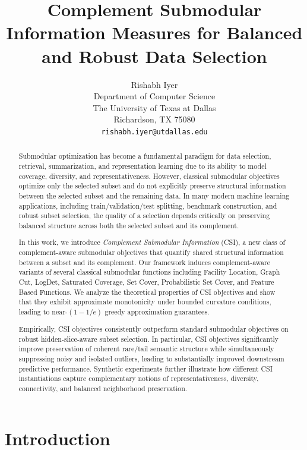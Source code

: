 \documentclass[11pt]{article}
\title{
Complement Submodular Information Measures for Balanced and Robust Data Selection
}
\author{
Rishabh Iyer \\
Department of Computer Science \\
The University of Texas at Dallas \\
Richardson, TX 75080 \\
\texttt{rishabh.iyer@utdallas.edu}
}
\date{}
\begin{document}
\maketitle

\begin{abstract}

Submodular optimization has become a fundamental paradigm for data selection, retrieval, summarization, and representation learning due to its ability to model coverage, diversity, and representativeness. However, classical submodular objectives optimize only the selected subset and do not explicitly preserve structural information between the selected subset and the remaining data. In many modern machine learning applications, including train/validation/test splitting, benchmark construction, and robust subset selection, the quality of a selection depends critically on preserving balanced structure across both the selected subset and its complement. 

In this work, we introduce \emph{Complement Submodular Information} (CSI), a new class of complement-aware submodular objectives that quantify shared structural information between a subset and its complement. Our framework induces complement-aware variants of several classical submodular functions including Facility Location, Graph Cut, LogDet, Saturated Coverage, Set Cover, Probabilistic Set Cover, and Feature Based Functions. We analyze the theoretical properties of CSI objectives and show that they exhibit approximate monotonicity under bounded curvature conditions, leading to near-$(1-1/e)$ greedy approximation guarantees.

Empirically, CSI objectives consistently outperform standard submodular objectives on robust hidden-slice-aware subset selection. In particular, CSI objectives significantly improve preservation of coherent rare/tail semantic structure while simultaneously suppressing noisy and isolated outliers, leading to substantially improved downstream predictive performance. Synthetic experiments further illustrate how different CSI instantiations capture complementary notions of representativeness, diversity, connectivity, and balanced neighborhood preservation.
\end{abstract}

\section{Introduction}
\end{document}
